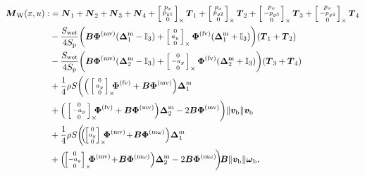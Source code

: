 \begin{align} 
\label{eq:MbColibri}
\boldsymbol{M}_{\text{W}}(x,u) :&=\boldsymbol{N}_{1} + \boldsymbol{N}_{2} + \boldsymbol{N}_{3} + \boldsymbol{N}_{4} +\skewsym{\smallm{p_x\\ p_{y1}\\ 0}} \boldsymbol{T}_{1} +\skewsym{\smallm{p_x\\ p_{y2}\\ 0}} \boldsymbol{T}_{2} + \skewsym{\smallm{p_x\\ - p_{y3}\\ 0}} \boldsymbol{T}_{3} + \skewsym{\smallm{p_x\\ - p_{y4}\\ 0}} \boldsymbol{T}_{4}\\
    \nonumber
  &- \frac{S_{\text{wet}}}{4S_{\text{p}}} \bigg( \boldsymbol{B} \boldsymbol{\Phi}^{\text{(mv)}} (\boldsymbol{\Delta}^{\text{m}}_1- \mathbb{I}_{3} ) + \skewsym{\smallm{0 \\ a_y \\ 0}} \boldsymbol{\Phi}^{\text{(fv)}} (\boldsymbol{\Delta}^{\text{m}}_1 +\mathbb{I}_{3} ) \bigg) (\boldsymbol{T}_{1}+\boldsymbol{T}_{2}) \\
    \nonumber
  & - \frac{S_{\text{wet}}}{4S_{\text{p}}} \bigg( \boldsymbol{B} \boldsymbol{\Phi}^{\text{(mv)}} (\boldsymbol{\Delta}^{\text{m}}_2 - \mathbb{I}_{3} ) +  \skewsym{\smallm{0 \\ - a_y \\ 0}} \boldsymbol{\Phi}^{\text{(fv)}} (\boldsymbol{\Delta}^{\text{m}}_2 + \mathbb{I}_{3}) \bigg) (\boldsymbol{T}_{3}+\boldsymbol{T}_{4}) \\
    \nonumber
  & + \frac{1}{4} \rho S  \bigg( \Big(\skewsym{\smallm{0 \\ a_y \\ 0}} \!\!\! \boldsymbol{\Phi}^{\text{(fv)}}  + \boldsymbol{B} \boldsymbol{\Phi}^{\text{(mv)}} \Big) \boldsymbol{\Delta}^{\text{m}}_1 \\
    \nonumber
  &  + \Big( \skewsym{\smallm{0 \\ - a_y \\ 0}} \!\!\! \boldsymbol{\Phi}^{\text{(fv)}} + \boldsymbol{B} \boldsymbol{\Phi}^{\text{(mv)}}  \Big) \boldsymbol{\Delta}^{\text{m}}_2 - 2 \boldsymbol{B} \boldsymbol{\Phi}^{\text{(mv)}}  \bigg) \lVert \boldsymbol{v_{\text{b}}} \rVert \boldsymbol{v_{\text{b}}} \\
    \nonumber
  & +\frac{1}{4} \rho S \bigg(\!\! \Big(\!\! \skewsym{\!\smallm{0 \\ a_y \\ 0}\!}\!\!\! \boldsymbol{\Phi}^{\text{(mv)}} \! + \! \boldsymbol{B} \boldsymbol{\Phi}^{\text{(m$\omega$)}} \Big) \boldsymbol{\Delta}^{\text{m}}_1 \\
    \nonumber
  & +  \Big(\!\! \skewsym{\!\smallm{0 \\ - a_y \\ 0}\!} \!\!\! \boldsymbol{\Phi}^{\text{(mv)}} \! + \! \boldsymbol{B} \boldsymbol{\Phi}^{\text{(m$\omega$)}}  \Big) \boldsymbol{\Delta}^{\text{m}}_2 - 2 \boldsymbol{B} \boldsymbol{\Phi}^{\text{(m$\omega$)}}\!  \bigg)\!  \boldsymbol{B}  \lVert \boldsymbol{v_{\text{b}}} \rVert  \boldsymbol{\omega}_{\text{b}} ,
\end{align}
